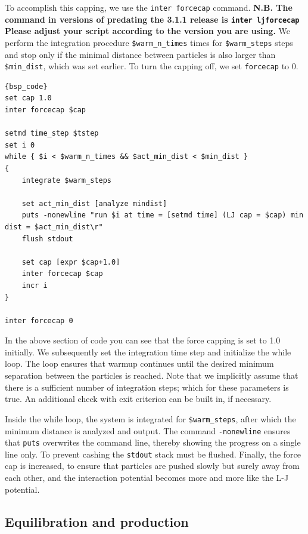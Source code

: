 \documentclass[
paper=a4,                       %
fontsize=11pt,                  %
twoside,                        %
footsepline,                    %
headsepline,                    %
headinclude=false,              %
footinclude=false,              %
pagesize,                       %
]{scrartcl}
\begin{document}
To accomplish this capping, we use the \lstinline|inter forcecap| command. \textbf{N.B. The command in versions of \es{} predating the 3.1.1 release is \lstinline|inter ljforcecap| Please adjust your script according to the version you are using.} We perform the integration procedure  \verb"$warm_n_times" times for \verb"$warm_steps" steps and stop only if the minimal distance between particles is also larger than \verb"$min_dist", which was set earlier. To turn the capping off, we set \texttt{forcecap} to 0. 

{\small\vspace{0,2cm}
\begin{lstlisting}[firstnumber=auto]{bsp_code}
set cap 1.0
inter forcecap $cap

setmd time_step $tstep
set i 0
while { $i < $warm_n_times && $act_min_dist < $min_dist } 
{
    integrate $warm_steps

    set act_min_dist [analyze mindist]
    puts -nonewline "run $i at time = [setmd time] (LJ cap = $cap) min dist = $act_min_dist\r"
    flush stdout

    set cap [expr $cap+1.0]
    inter forcecap $cap
    incr i
}

inter forcecap 0
\end{lstlisting}\vspace{0,2cm}
}

\noindent In the above section of code you can see that the force capping is set to 1.0 initially. We subsequently set the integration time step and initialize the while loop. The loop ensures that warmup continues until the desired minimum separation between the particles is reached. Note that we implicitly assume that there is a sufficient number of integration steps; which for these parameters is true. An additional check with exit criterion can be built in, if necessary.

Inside the while loop, the system is integrated for \verb"$warm_steps", after which the minimum distance is analyzed and output. The command \texttt{-nonewline} ensures that \verb"puts" overwrites the command line, thereby showing the progress on a single line only. To prevent cashing the \texttt{stdout} stack must be flushed. Finally, the force cap is increased, to ensure that particles are pushed slowly but surely away from each other, and the interaction potential becomes more and more like the L-J potential. 

\subsection{Equilibration and production}
\end{document}
